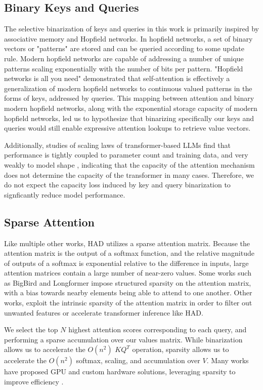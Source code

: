 \subsection{Binary Keys and Queries}
The selective binarization of keys and queries in this work is primarily inspired by associative memory and Hopfield networks.  In hopfield networks, a set of binary vectors or "patterns" are stored and can be queried according to some update rule.  Modern hopfield networks \cite{modern_hop} are capable of addressing a number of unique patterns scaling exponentially with the number of bits per pattern. "Hopfield networks is all you need" \cite{hopfield_is} demonstrated that self-attention is effectively a generalization of modern hopfield networks to continuous valued patterns in the forms of keys, addressed by queries.  This mapping between attention and binary modern hopfield networks, along with the exponential storage capacity of modern hopfield networks, led us to hypothesize that binarizing specifically our keys and queries would still enable expressive attention lookups to retrieve value vectors.  \par Additionally, studies of scaling laws of transformer-based LLMs find that performance is tightly coupled to parameter count and training data, and very weakly to model shape \cite{scaling}, indicating that the capacity of the attention mechanism does not determine the capacity of the transformer in many cases.  Therefore, we do not expect the capacity loss induced by key and query binarization to signficantly reduce model performance.

\subsection{Sparse Attention}
Like multiple other works, HAD utilizes a sparse attention matrix.  Because the attention matrix is the output of a softmax function, and the relative magnitude of outputs of a softmax is exponential relative to the difference in inputs, large attention matrices contain a large number of near-zero values.  Some works such as BigBird \cite{bigbird} and Longformer \cite{longformer} impose structured sparsity on the attention matrix, with a bias towards nearby elements being able to attend to one another.  Other works, exploit the intrinsic sparsity of the attention matrix in order to filter out unwanted features \cite{sparse_att_filter} or accelerate transformer inference \cite{sparse_att_acc} like HAD.  
\par We select the top $N$ highest attention scores corresponding to each query, and performing a sparse accumulation over our values matrix.  While binarization allows us to accelerate the $O(n^2)$ $K Q^T$ operation, sparsity allows us to accelerate the $O(n^2)$ softmax, scaling, and accumulation over $V$. Many works have proposed GPU and custom hardware solutions, leveraging sparsity to improve efficiency \cite{sparse_asic,sparse_gpu}.